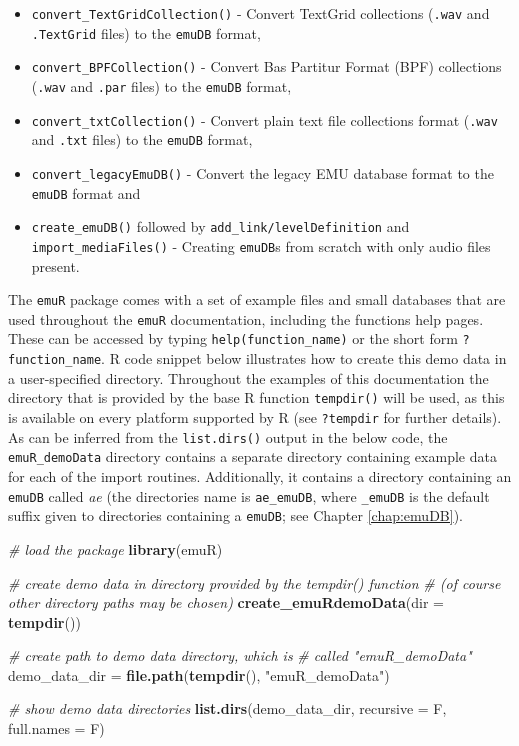 \documentclass[]{book}
\newenvironment{Shaded}{\begin{snugshade}}{\end{snugshade}}
\newcommand{\CommentTok}[1]{\textcolor[rgb]{0.56,0.35,0.01}{\textit{#1}}}
\newcommand{\DataTypeTok}[1]{\textcolor[rgb]{0.13,0.29,0.53}{#1}}
\newcommand{\KeywordTok}[1]{\textcolor[rgb]{0.13,0.29,0.53}{\textbf{#1}}}
\newcommand{\NormalTok}[1]{#1}
\newcommand{\StringTok}[1]{\textcolor[rgb]{0.31,0.60,0.02}{#1}}
\providecommand{\tightlist}{%
  \setlength{\itemsep}{0pt}\setlength{\parskip}{0pt}}
\begin{document}
\begin{itemize}
\tightlist
\item
  \texttt{convert\_TextGridCollection()} - Convert TextGrid collections (\texttt{.wav} and \texttt{.TextGrid} files) to the \texttt{emuDB} format,
\item
  \texttt{convert\_BPFCollection()} - Convert Bas Partitur Format (BPF) collections (\texttt{.wav} and \texttt{.par} files) to the \texttt{emuDB} format,
\item
  \texttt{convert\_txtCollection()} - Convert plain text file collections format (\texttt{.wav} and \texttt{.txt} files) to the \texttt{emuDB} format,
\item
  \texttt{convert\_legacyEmuDB()} - Convert the legacy EMU database format to the \texttt{emuDB} format and
\item
  \texttt{create\_emuDB()} followed by \texttt{add\_link/levelDefinition} and \texttt{import\_mediaFiles()} - Creating \texttt{emuDB}s from scratch with only audio files present.
\end{itemize}

The \texttt{emuR} package comes with a set of example files and small databases that are used throughout the \texttt{emuR} documentation, including the functions help pages. These can be accessed by typing \texttt{help(function\_name)} or the short form \texttt{?function\_name}. R code snippet below illustrates how to create this demo data in a user-specified directory. Throughout the examples of this documentation the directory that is provided by the base R function \texttt{tempdir()} will be used, as this is available on every platform supported by R (see \texttt{?tempdir} for further details). As can be inferred from the \texttt{list.dirs()} output in the below code, the \texttt{emuR\_demoData} directory contains a separate directory containing example data for each of the import routines. Additionally, it contains a directory containing an \texttt{emuDB} called \emph{ae} (the directories name is \texttt{ae\_emuDB}, where \texttt{\_emuDB} is the default suffix given to directories containing a \texttt{emuDB}; see Chapter \ref{chap:emuDB}).

\begin{Shaded}
\begin{Highlighting}[]
\CommentTok{# load the package}
\KeywordTok{library}\NormalTok{(emuR)}

\CommentTok{# create demo data in directory provided by the tempdir() function}
\CommentTok{# (of course other directory paths may be chosen)}
\KeywordTok{create_emuRdemoData}\NormalTok{(}\DataTypeTok{dir =} \KeywordTok{tempdir}\NormalTok{())}

\CommentTok{# create path to demo data directory, which is}
\CommentTok{# called "emuR_demoData"}
\NormalTok{demo_data_dir =}\StringTok{ }\KeywordTok{file.path}\NormalTok{(}\KeywordTok{tempdir}\NormalTok{(), }\StringTok{"emuR_demoData"}\NormalTok{)}

\CommentTok{# show demo data directories}
\KeywordTok{list.dirs}\NormalTok{(demo_data_dir, }\DataTypeTok{recursive =}\NormalTok{ F, }\DataTypeTok{full.names =}\NormalTok{ F)}
\end{Highlighting}
\end{Shaded}
\end{document}
